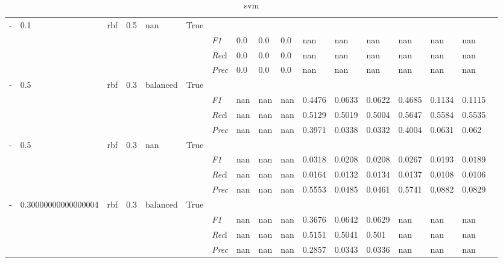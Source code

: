 \begin{table}[]
\begin{tabularx}{\textwidth}{XXXXXX|X|XXX|XXX|XXXX}
    - & 0.1 & rbf & 0.5 & nan &True & & & & & & & & & \\
    & & & & & & \textit{F1} & 0.0 & 0.0 & 0.0 & nan & nan        & nan        & nan        & nan        & nan        \\
    & & & & & & \textit{Rec}l & 0.0 & 0.0 & 0.0    & nan & nan    & nan    & nan    & nan    & nan    \\
    & & & & & & \textit{Prec} & 0.0 & 0.0 & 0.0 & nan & nan & nan & nan & nan & nan \\ \midrule
    - & 0.5 & rbf & 0.3 & balanced &True & & & & & & & & & \\
    & & & & & & \textit{F1} & nan & nan & nan & 0.4476 & 0.0633        & 0.0622        & 0.4685        & 0.1134        & 0.1115        \\
    & & & & & & \textit{Rec}l & nan & nan & nan    & 0.5129 & 0.5019    & 0.5004    & 0.5647    & 0.5584    & 0.5535    \\
    & & & & & & \textit{Prec} & nan & nan & nan & 0.3971 & 0.0338 & 0.0332 & 0.4004 & 0.0631 & 0.062 \\ \midrule
    - & 0.5 & rbf & 0.3 & nan &True & & & & & & & & & \\
    & & & & & & \textit{F1} & nan & nan & nan & 0.0318 & 0.0208        & 0.0208        & 0.0267        & 0.0193        & 0.0189        \\
    & & & & & & \textit{Rec}l & nan & nan & nan    & 0.0164 & 0.0132    & 0.0134    & 0.0137    & 0.0108    & 0.0106    \\
    & & & & & & \textit{Prec} & nan & nan & nan & 0.5553 & 0.0485 & 0.0461 & 0.5741 & 0.0882 & 0.0829 \\ \midrule
    - & 0.30000000000000004 & rbf & 0.3 & balanced &True & & & & & & & & & \\
    & & & & & & \textit{F1} & nan & nan & nan & 0.3676 & 0.0642        & 0.0629        & nan        & nan        & nan        \\
    & & & & & & \textit{Rec}l & nan & nan & nan    & 0.5151 & 0.5041    & 0.501    & nan    & nan    & nan    \\
    & & & & & & \textit{Prec} & nan & nan & nan & 0.2857 & 0.0343 & 0.0336 & nan & nan & nan \\ \midrule
    \end{tabularx}
    \caption{svm}
    \label{tab:all_results_svm}
    \end{table}
